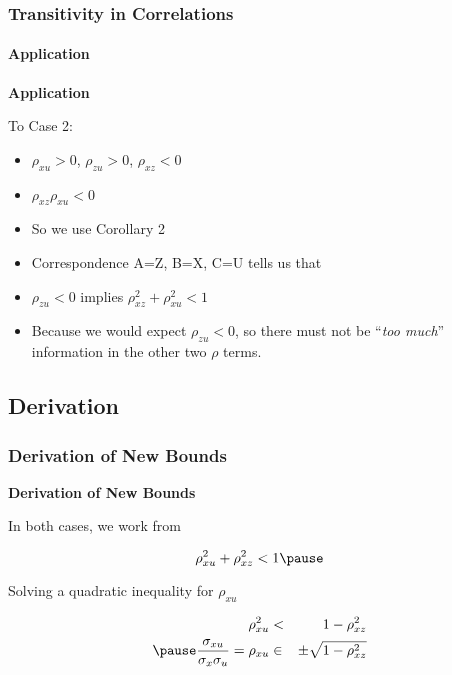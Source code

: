 \documentclass{beamer}
\begin{document}
\begin{frame}
\frametitle{Transitivity in Correlations}
\framesubtitle{Application}
\textbf{Application} \\ \bigskip \pause

To Case 2: \pause

\begin{itemize}
  \item $\rho_{xu}>0$, $\rho_{zu}>0$, $\rho_{xz}<0$ \pause
  \item $\rho_{xz}\rho_{xu}<0$ \pause
  \item So we use Corollary 2 \pause
  \item Correspondence  A=Z, B=X, C=U tells us that  \pause
  \item $\rho_{zu}<0$ \pause implies $\rho_{xz}^2+\rho_{xu}^2<1$  \pause
  \item Because we would expect $\rho_{zu}<0$, so there must not be ``\emph{too much}'' information in the other two $\rho$ terms.
\end{itemize}

\end{frame}

\subsection{Derivation}

\begin{frame}
\frametitle{Derivation of New Bounds}
\textbf{Derivation of New Bounds } \\ \bigskip \pause

In both cases, we work from \pause

\begin{equation*}
\rho_{xu}^2+\rho_{xz}^2<1 \label{eqn:cond_3} \pause
\end{equation*}

Solving a quadratic inequality for $\rho_{xu}$ \pause

\begin{eqnarray*}
\rho_{xu}^2 &<&{1-\rho_{xz}^2} \nonumber \\ \pause
\frac{\sigma_{xu}}{\sigma_x \sigma_u}=\rho_{xu}&\in& \pm \sqrt{1-\rho_{xz}^2} \nonumber \\
\end{eqnarray*}

\end{frame}
\end{document}
